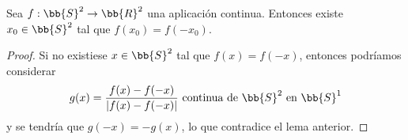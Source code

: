 \begin{teo}
    Sea $f:\bb{S}^2 \to \bb{R}^2$ una aplicación continua. Entonces existe $x_0\in \bb{S}^2$ tal que $f(x_0)=f(-x_0)$.

    \begin{proof}
        Si no existiese $x\in \bb{S}^2$ tal que $f(x)=f(-x)$, entonces podríamos considerar 
        \begin{gather*}
            g(x) = \frac{f(x)-f(-x)}{|f(x)-f(-x)|} \text{ continua de $\bb{S}^2$ en $\bb{S}^1$}
        \end{gather*}
        y se tendría que $g(-x)=-g(x)$, lo que contradice el lema anterior.
    \end{proof}
\end{teo}

